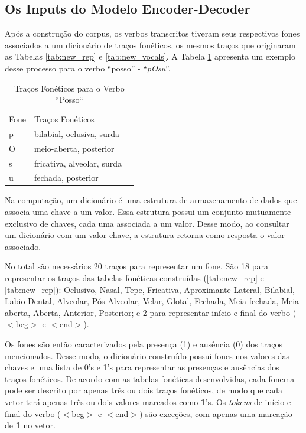 \subsection{Os Inputs do Modelo Encoder-Decoder}
\label{sec:inputs}

Após a construção do corpus, os verbos transcritos tiveram seus respectivos fones associados a um dicionário de traços fonéticos, os mesmos traços que originaram as Tabelas \ref{tab:new_rep} e \ref{tab:new_vocals}. A Tabela \ref{tab:pOsu} apresenta um exemplo desse processo para o verbo “posso” - “\textit{pOsu}”. 

\begin{table}[H]
\begin{center}
\begin{tabular}{lll}
Fone & Traços Fonéticos &  \\ \cline{1-2}
p & bilabial, oclusiva, surda &  \\
O & meio-aberta, posterior &  \\
s & fricativa, alveolar, surda &  \\
u & fechada, posterior & 
\end{tabular}
\end{center}
\caption{Traços Fonéticos para o Verbo “Posso“}
\label{tab:pOsu}
\end{table}

Na computação, um dicionário é uma estrutura de armazenamento de dados que associa uma chave a um valor. Essa estrutura possui um conjunto mutuamente exclusivo de chaves, cada uma associada a um valor. Desse modo, ao consultar um dicionário com um valor chave, a estrutura retorna como resposta o valor associado.

 No total são necessários 20 traços para representar um fone. São 18 para representar os traços das tabelas fonéticas construídas (\ref{tab:new_rep} e \ref{tab:new_rep}): Oclusivo, Nasal, Tepe, Fricativa, Aproximante Lateral, Bilabial, Labio-Dental, Alveolar, Pós-Alveolar, Velar, Glotal, Fechada, Meia-fechada, Meia-aberta, Aberta, Anterior, Posterior; e 2 para representar início e final do verbo ($<$beg$>$ e $<$end$>$).

Os fones são então caracterizados pela presença (1) e ausência (0) dos traços mencionados. Desse modo, o dicionário construído possui fones nos valores das chaves e uma lista de 0's e 1's para representar as presenças e ausências dos traços fonéticos. De acordo com as tabelas fonéticas desenvolvidas, cada fonema pode ser descrito por apenas três ou dois traços fonéticos, de modo que cada vetor terá apenas três ou dois valores marcados como \textbf{1}'s. Os \textit{tokens} de início e final do verbo ($<$beg$>$ e $<$end$>$) são exceções, com apenas uma marcação de \textbf{1} no vetor. 

